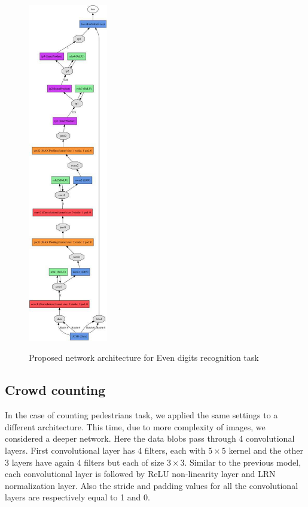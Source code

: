\begin{figure}
  \centering
   {\includegraphics[width=0.31\textwidth]{images/model}}
	\caption{Proposed network architecture for Even digits recognition task}
	\label{fig:l2cNet}
\end{figure}
\subsection{Crowd counting}
\label{subsec:ucsdarch}
In the case of counting pedestrians task, we applied the same settings to a different architecture. This time, due to more complexity of images, we considered a deeper network. Here the data blobs pass through 4 convolutional layers. First convolutional layer has 4 filters, each with $5\times5$ kernel and the other 3 layers have again 4 filters but each of size $3\times3$. Similar to the previous model, each convolutional layer is followed by ReLU non-linearity layer and LRN normalization layer. Also the stride and padding values for all the convolutional layers are respectively equal to 1 and 0. 

